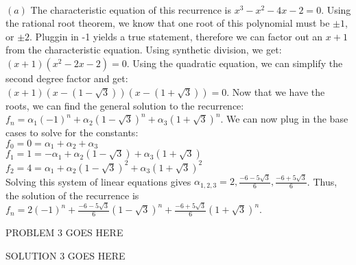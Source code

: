 \documentclass[11pt]{article}
\begin{document}
\begin{solution} \\
	$(a)$ 
		The characteristic equation of this recurrence is $x^3 - x^2 -4x - 2 = 0$. Using the rational root theorem, we know that one root of this polynomial must be $\pm1$, or $\pm 2$. Pluggin in -1 yields a true statement, therefore we can factor out an $x+1$ from the characteristic equation. Using synthetic division, we get: $(x+1)(x^2 - 2x - 2) = 0$. Using the quadratic equation, we can simplify the second degree factor and get: $(x+1)(x - (1 - \sqrt{3}))(x-(1+ \sqrt{3})) = 0$. Now that we have the roots, we can find the general solution to the recurrence: $f_n = \alpha_1(-1)^n + \alpha_2(1 - \sqrt{3})^n + \alpha_3(1 + \sqrt{3})^n $. We can now plug in the base cases to solve for the constants: \\ $f_0 = 0 = \alpha_1 + \alpha_2 + \alpha_3$ \\ $ f_1 = 1 = -\alpha_1 + \alpha_2(1-\sqrt{3}) + \alpha_3(1+\sqrt{3}) $ \\ $ f_2 = 4 = \alpha_1 + \alpha_2(1-\sqrt{3})^2 + \alpha_3(1+\sqrt{3})^2 $ \\ Solving this system of linear equations gives $\alpha_{1,2,3} = 2, \frac{-6 - 5\sqrt{3}}{6}, \frac{-6 + 5\sqrt{3}}{6} $. Thus, the solution of the recurrence is $f_n = 2(-1)^n + \frac{-6 - 5\sqrt{3}}{6}(1 - \sqrt{3})^n + \frac{-6 + 5\sqrt{3}}{6}(1 + \sqrt{3})^n $.
\end{solution}

\newpage
\begin{problem}
 	PROBLEM 3 GOES HERE
\end{problem}

\begin{solution}
	SOLUTION 3 GOES HERE
\end{solution}
\end{document}
